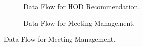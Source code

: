 \documentclass[12pt]{article}
\begin{document}
\begin{figure}
\begin{subfigure}[p]{0.47\textwidth}
\centering	
{}
\caption{Data Flow for HOD Recommendation.}
\end{subfigure}

\begin{subfigure}[p]{0.47\textwidth}
\centering	
{}
\caption{Data Flow for Meeting Management.}
\end{subfigure}


\end{figure}
\end{document}
